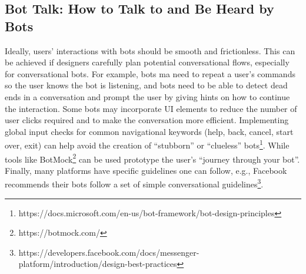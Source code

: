 \documentclass{sig-alternate}
\begin{document}
	\subsection{Bot Talk: How to Talk to and Be Heard by Bots}

	Ideally, users' interactions with bots should be smooth and frictionless. 
	This can be achieved if designers carefully plan potential conversational flows, especially for conversational bots. For example, bots ma need to repeat a user's commands so the user knows the bot is listening, and bots need to be able to detect dead ends in a conversation and prompt the user by giving hints on how to continue the interaction. Some bots may incorporate UI elements to reduce the number of user clicks required and to make the conversation more efficient. 
	Implementing global input checks for common navigational keywords (help, back, cancel, start over, exit) can help avoid the creation of ``stubborn'' or ``clueless'' bots\footnote{https://docs.microsoft.com/en-us/bot-framework/bot-design-principles}.
	While tools like BotMock\footnote{https://botmock.com/} can be used prototype the user's ``journey through your bot''. 
%
%
	Finally, many platforms have specific guidelines one can follow, e.g., Facebook recommends their bots follow a set of simple conversational guidelines\footnote{https://developers.facebook.com/docs/messenger-platform/introduction/design-best-practices}. 
\end{document}
